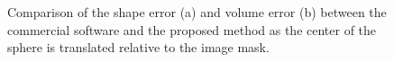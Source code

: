 \begin{figure}[b!]
	\centering
	\caption{Comparison of the shape error (a) and volume error (b) between the commercial software and the proposed method as the center of the sphere is translated relative to the image mask.}
	\label{fig:graph3}
\end{figure}

